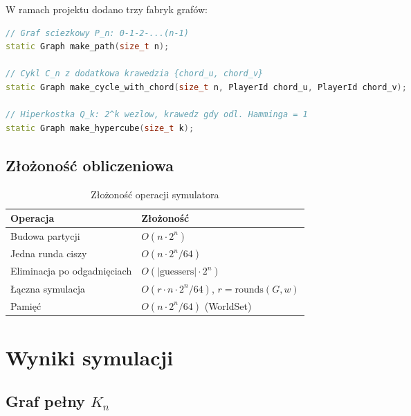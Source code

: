 \documentclass[12pt,a4paper]{article}
\theoremstyle{plain}
\theoremstyle{definition}
\theoremstyle{remark}
\newcommand{\rounds}{\mathrm{rounds}}
\begin{document}
W ramach projektu dodano trzy fabryk grafów:
\begin{lstlisting}[language=C++, caption={Nowe fabryki grafów}]
// Graf sciezkowy P_n: 0-1-2-...(n-1)
static Graph make_path(size_t n);

// Cykl C_n z dodatkowa krawedzia {chord_u, chord_v}
static Graph make_cycle_with_chord(size_t n, PlayerId chord_u, PlayerId chord_v);

// Hiperkostka Q_k: 2^k wezlow, krawedz gdy odl. Hamminga = 1
static Graph make_hypercube(size_t k);
\end{lstlisting}

\subsection{Złożoność obliczeniowa}

\begin{table}[h]
\centering
\caption{Złożoność operacji symulatora}
\begin{tabular}{ll}
\toprule
Operacja & Złożoność \\
\midrule
Budowa partycji & $O(n \cdot 2^n)$ \\
Jedna runda ciszy & $O(n \cdot 2^n / 64)$ \\
Eliminacja po odgadnięciach & $O(|\text{guessers}| \cdot 2^n)$ \\
Łączna symulacja & $O(r \cdot n \cdot 2^n / 64)$, $r = \rounds(G,w)$ \\
Pamięć & $O(n \cdot 2^n / 64)$ (WorldSet) \\
\bottomrule
\end{tabular}
\end{table}

\section{Wyniki symulacji}

\subsection{Graf pełny $K_n$}
\end{document}
